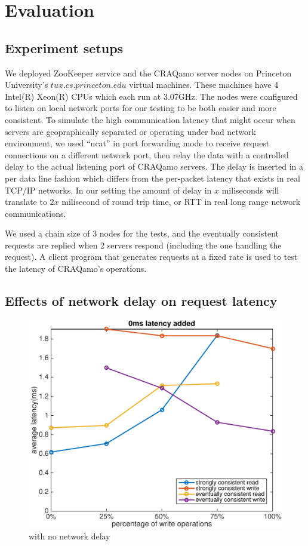 \section{Evaluation}
\label{sec:eval}

\subsection{Experiment setups}
We deployed ZooKeeper service and the CRAQamo server nodes on Princeton University's $tux.cs.princeton.edu$ virtual machines.
These machines have 4 Intel(R) Xeon(R) CPUs which each run at 3.07GHz. The nodes were configured to listen on local network ports for our testing to be both easier and more consistent. To simulate the high communication latency that might occur when servers are geopraphically separated or operating under bad network environment, we used ``ncat'' in port forwarding mode to receive request connections on a different network port, then relay the data with a controlled delay to the actual listening port of CRAQamo servers. The delay is inserted in a per data line fashion which differs from the per-packet latency that exists in real TCP/IP networks. In our setting the amount of delay in $x$ miliseconds will
translate to $2x$ milisecond of round trip time, or RTT in real long range network communications. 

We used a chain size of 3 nodes for the tests, and the eventually consistent requests are replied when 2 servers respond (including the one handling the request). A client program that generates requests at a fixed rate is used to test the latency of CRAQamo's operations. 

\subsection{Effects of network delay on request latency}
\vspace{-5mm}
\begin{figure}[hbt]
\centering
\includegraphics[width=0.95\linewidth]{figures/latency_0.pdf}
\caption{with no network delay}
\label{fig:latency_0}
\end{figure}

